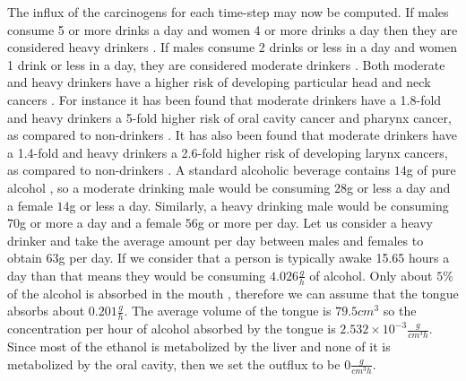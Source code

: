 \documentclass[\main/thesis.tex]{subfiles}
\begin{document}
The influx of the carcinogens for each time-step may now be computed. If males consume 5 or more drinks a day and women 4 or more drinks a day then they are considered heavy drinkers \cite{niaaa.nih.gov_2021_2}. If males consume 2 drinks or less in a day and women 1 drink or less in a day, they are considered moderate drinkers \cite{niaaa.nih.gov_2021_2}. Both moderate and heavy drinkers have a higher risk of developing particular head and neck cancers \cite{Bagnardi, LoConte}. For instance it has been found that moderate drinkers have a 1.8-fold  and heavy drinkers a 5-fold higher risk of oral cavity cancer and pharynx cancer, as compared to non-drinkers \cite{Bagnardi, LoConte}. It has also been found that moderate drinkers have a 1.4-fold and heavy drinkers a 2.6-fold higher risk of developing larynx cancers, as compared to non-drinkers \cite{Bagnardi, LoConte}. A standard alcoholic beverage contains $14$g of pure alcohol \cite{niaaa.nih.gov_2021_1}, so a moderate drinking male would be consuming $28$g or less a day and a female $14$g or less a day. Similarly, a heavy drinking male would be consuming $70$g or more a day and a female $56$g or more per day. Let us consider a heavy drinker and take the average amount per day between males and females to obtain $63$g per day. If we consider that a person is typically awake 15.65 hours a day than that means they would be consuming $4.026 \frac{g}{h}$ of alcohol. Only about $5\%$ of the alcohol is absorbed in the mouth \cite{proserve.aglc.ca}, therefore we can assume that the tongue absorbs about $0.201 \frac{g}{h}$. The average volume of the tongue is $79.5 cm^3$ \cite{Liégeois} so the concentration per hour of alcohol absorbed by the tongue is $2.532{\times}10^{-3} \frac{g}{cm^3 h}$. Since most of the ethanol is metabolized by the liver and none of it is metabolized by the oral cavity, then we set the outflux to be $0 \frac{g}{cm^3 h}$. 
\end{document}

